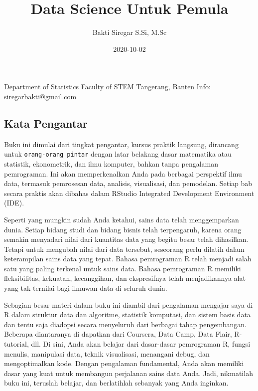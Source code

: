\documentclass[
]{book}
\title{Data Science Untuk Pemula}
\author{Bakti Siregar S.Si, M.Sc}
\date{2020-10-02}
\begin{document}
\maketitle

{
\setcounter{tocdepth}{1}
\tableofcontents
}
\hypertarget{section}{%
\chapter*{}\label{section}}

Department of Statistics
Faculty of STEM
Tangerang, Banten
Info: siregarbakti@gmail.com

\hypertarget{kata-pengantar}{%
\section*{Kata Pengantar}\label{kata-pengantar}}

Buku ini dimulai dari tingkat pengantar, kursus praktik langsung, dirancang untuk \texttt{orang-orang\ pintar} dengan latar belakang dasar matematika atau statistik, ekonometrik, dan ilmu komputer, bahkan tanpa pengalaman pemrograman. Ini akan memperkenalkan Anda pada berbagai perspektif ilmu data, termasuk pemrosesan data, analisis, visualisasi, dan pemodelan. Setiap bab secara praktis akan dibahas dalam RStudio Integrated Development Environment (IDE).

Seperti yang mungkin sudah Anda ketahui, sains data telah menggemparkan dunia. Setiap bidang studi dan bidang bisnis telah terpengaruh, karena orang semakin menyadari nilai dari kuantitas data yang begitu besar telah dihasilkan. Tetapi untuk mengubah nilai dari data tersebut, seseorang perlu dilatih dalam keterampilan sains data yang tepat. Bahasa pemrograman R telah menjadi salah satu yang paling terkenal untuk sains data. Bahasa pemrograman R memiliki fleksibilitas, kekuatan, kecanggihan, dan ekspresifnya telah menjadikannya alat yang tak ternilai bagi ilmuwan data di seluruh dunia.

Sebagian besar materi dalam buku ini diambil dari pengalaman mengajar saya di R dalam struktur data dan algoritme, statistik komputasi, dan sistem basis data dan tentu saja diadopsi secara menyeluruh dari berbagai tahap pengembangan. Beberapa diantaranya di dapatkan dari Coursera, Data Camp, Data Flair, R-tutorial, dll. Di sini, Anda akan belajar dari dasar-dasar pemrograman R, fungsi menulis, manipulasi data, teknik visualisasi, menangani debug, dan mengoptimalkan kode. Dengan pengalaman fundamental, Anda akan memiliki dasar yang kuat untuk membangun perjalanan sains data Anda. Jadi, nikmatilah buku ini, teruslah belajar, dan berlatihlah sebanyak yang Anda inginkan.
\end{document}

